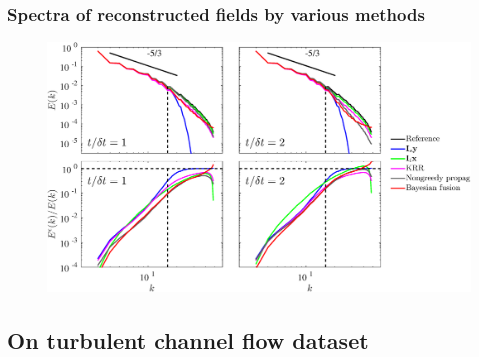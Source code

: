 \documentclass{beamer}
\begin{document}
\begin{frame}
\frametitle{Spectra of reconstructed fields by various methods}
	\begin{figure}
		\includegraphics[width=\textwidth]{./figures/comparisons/isotropic/spectra_sspacing3_tspacing4_spectra2d_sidelegends.eps}
	\end{figure}
\end{frame}


\subsection[Channel flow]{On turbulent channel flow dataset}
\end{document}
